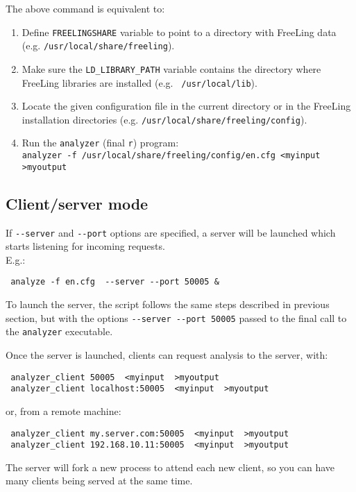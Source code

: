 \documentclass[a4paper]{book}
\begin{document}
 The above command is equivalent to:
\begin{enumerate}
\itemsep -0.12cm
\item Define {\tt FREELINGSHARE} variable to point to a directory with
  FreeLing data\\ (e.g. {\tt /usr/local/share/freeling}).
\item Make sure the \verb#LD_LIBRARY_PATH# variable contains the
  directory where FreeLing libraries are installed (e.g. {\tt
    /usr/local/lib}).
\item Locate the given configuration file in the current directory or in
 the FreeLing installation directories (e.g. {\tt /usr/local/share/freeling/config}).
\item Run the {\tt analyzer} (final {\tt r}) program:\\ 
      \verb#analyzer -f /usr/local/share/freeling/config/en.cfg <myinput >myoutput#
\end{enumerate}

\subsection{Client/server mode}

  If \verb#--server# and \verb#--port# options are specified, a server 
  will be launched which starts listening for incoming
  requests.\\ E.g.:
\begin{verbatim}
 analyze -f en.cfg  --server --port 50005 &
\end{verbatim}
 To launch the server, the script follows the same steps described in
 previous section, but with the options \verb#--server --port 50005#
 passed to the final call to the \verb#analyzer# executable.
\medskip

\noindent Once the server is launched, clients can request analysis to
the server, with:
\begin{verbatim}
 analyzer_client 50005  <myinput  >myoutput
 analyzer_client localhost:50005  <myinput  >myoutput
\end{verbatim}
\noindent or, from a remote machine:
\begin{verbatim}
 analyzer_client my.server.com:50005  <myinput  >myoutput
 analyzer_client 192.168.10.11:50005  <myinput  >myoutput
\end{verbatim}

 The server will fork a new process to attend each new client,
 so you can have many clients being served at the same time.
\end{document}
